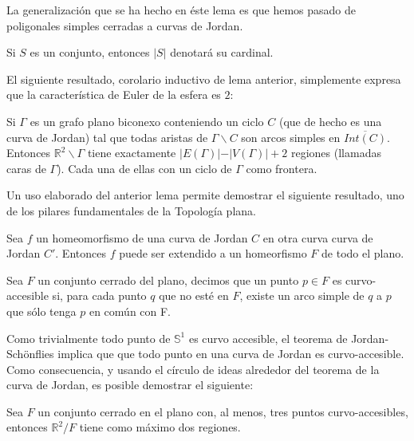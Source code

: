 	La generalización que se ha hecho en éste lema es que hemos pasado de poligonales simples cerradas a curvas de Jordan.
	
	\begin{definition}
Si $S$ es un conjunto, entonces $\vert S \vert$ denotará su cardinal.
\end{definition}
El siguiente resultado, corolario inductivo de lema anterior, simplemente expresa que la característica de Euler de la esfera es $2$:
\begin{lemma}
	Si $\Gamma$ es un grafo plano biconexo conteniendo un ciclo $C$ (que de hecho es una curva de Jordan) tal que todas aristas de $\Gamma \backslash C$ son arcos simples en $\overline{Int(C)}$. Entonces $\mathbb{R}^2 \backslash \Gamma$ tiene exactamente $\vert E(\Gamma) \vert - \vert V(\Gamma) \vert + 2$ regiones (llamadas caras de $\Gamma$). Cada una de ellas con un ciclo de $\Gamma$ como frontera.
\end{lemma}

Un uso elaborado del anterior lema  permite demostrar el siguiente resultado, uno de los pilares fundamentales de la Topología plana.

\begin{theorem}
	Sea $f$ un homeomorfismo de una curva de Jordan $C$ en otra curva curva de Jordan $C'$. Entonces $f$ puede ser extendido a un homeorfismo $F$ de todo el plano.
\end{theorem}
 

\begin{definition}
	Sea $F$ un conjunto cerrado del plano, decimos que un punto $p \in F$ es curvo-accesible si, para cada punto $q$ que no esté en $F$, existe un arco simple de $q$ a $p$ que sólo tenga $p$ en común con F.
\end{definition}

Como trivialmente todo punto de $\mathbb{S}^1$ es curvo accesible, el teorema de Jordan-Schönflies implica que que todo punto en una curva de Jordan es curvo-accesible. Como consecuencia, y usando el círculo de ideas alrededor del teorema de la curva de Jordan, es posible demostrar el siguiente:

\begin{theorem}
	Sea $F$ un conjunto cerrado en el plano con, al menos, tres puntos curvo-accesibles, entonces $\mathbb{R}^2 / F$ tiene como máximo dos regiones.
\end{theorem}

